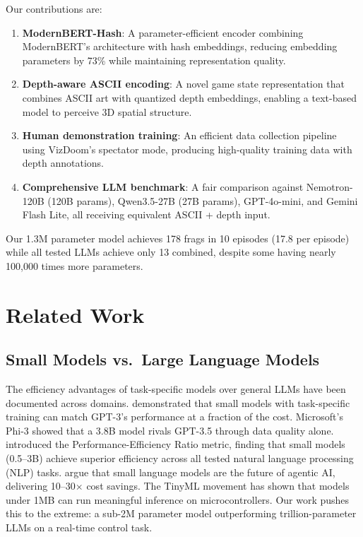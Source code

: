 \documentclass[11pt,a4paper]{article}
\begin{document}
Our contributions are:
\begin{enumerate}
    \item \textbf{ModernBERT-Hash}: A parameter-efficient encoder combining ModernBERT's architecture with hash embeddings, reducing embedding parameters by 73\% while maintaining representation quality.
    \item \textbf{Depth-aware ASCII encoding}: A novel game state representation that combines ASCII art with quantized depth embeddings, enabling a text-based model to perceive 3D spatial structure.
    \item \textbf{Human demonstration training}: An efficient data collection pipeline using VizDoom's spectator mode, producing high-quality training data with depth annotations.
    \item \textbf{Comprehensive LLM benchmark}: A fair comparison against Nemotron-120B (120B params), Qwen3.5-27B (27B params), GPT-4o-mini, and Gemini Flash Lite, all receiving equivalent ASCII + depth input.
\end{enumerate}

Our 1.3M parameter model achieves 178 frags in 10 episodes (17.8 per episode) while all tested LLMs achieve only 13 combined, despite some having nearly 100,000 times more parameters.

\section{Related Work}
\label{sec:related}

\subsection{Small Models vs.\ Large Language Models}

The efficiency advantages of task-specific models over general LLMs have been documented across domains. \citet{schick2021fewshot} demonstrated that small models with task-specific training can match GPT-3's performance at a fraction of the cost. Microsoft's Phi-3 \citep{abdin2024phi3} showed that a 3.8B model rivals GPT-3.5 through data quality alone. \citet{taskspecific2026} introduced the Performance-Efficiency Ratio metric, finding that small models (0.5--3B) achieve superior efficiency across all tested natural language processing (NLP) tasks. \citet{belcak2025slm} argue that small language models are the future of agentic AI, delivering 10--30$\times$ cost savings. The TinyML movement \citep{banbury2021mlperf} has shown that models under 1MB can run meaningful inference on microcontrollers. Our work pushes this to the extreme: a sub-2M parameter model outperforming trillion-parameter LLMs on a real-time control task.
\end{document}
